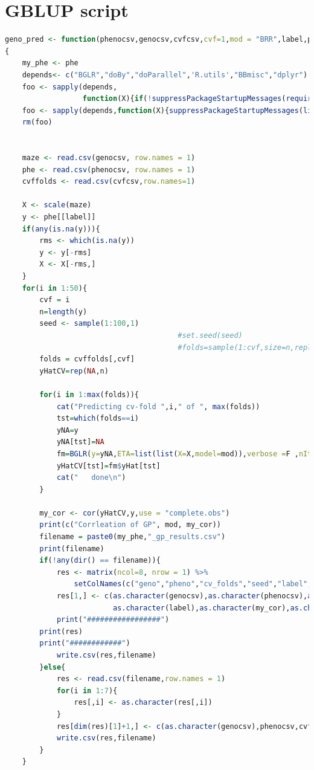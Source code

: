 \section{GBLUP script}
\begin{lstlisting}[language=R]
    geno_pred <- function(phenocsv,genocsv,cvfcsv,cvf=1,mod = "BRR",label,phe)
{
    my_phe <- phe
    depends<- c("BGLR","doBy","doParallel",'R.utils',"BBmisc","dplyr")
    foo <- sapply(depends,
                  function(X){if(!suppressPackageStartupMessages(require(X,character.only = T))){install.packages(X)}})
    foo <- sapply(depends,function(X){suppressPackageStartupMessages(library(X,character.only=TRUE))})
    rm(foo)
    
        
    maze <- read.csv(genocsv, row.names = 1)
    phe <- read.csv(phenocsv, row.names = 1)
    cvffolds <- read.csv(cvfcsv,row.names=1)
    
    X <- scale(maze)
    y <- phe[[label]]
    if(any(is.na(y))){
        rms <- which(is.na(y))
        y <- y[-rms]
        X <- X[-rms,]
    }
    for(i in 1:50){
        cvf = i
        n=length(y)
        seed <- sample(1:100,1)
                                        #set.seed(seed)
                                        #folds=sample(1:cvf,size=n,replace=T)
        folds = cvffolds[,cvf]
        yHatCV=rep(NA,n)
        
        for(i in 1:max(folds)){
            cat("Predicting cv-fold ",i," of ", max(folds))
            tst=which(folds==i)
            yNA=y
            yNA[tst]=NA
            fm=BGLR(y=yNA,ETA=list(list(X=X,model=mod)),verbose =F ,nIter=7000,burnIn=1000)
            yHatCV[tst]=fm$yHat[tst]
            cat("   done\n")
        }
        
        my_cor <- cor(yHatCV,y,use = "complete.obs")
        print(c("Corrleation of GP", mod, my_cor))
        filename = paste0(my_phe,"_gp_results.csv")
        print(filename)
        if(!any(dir() == filename)){
            res <- matrix(ncol=8, nrow = 1) %>%
                setColNames(c("geno","pheno","cv_folds","seed","label", "cor","method","nmark"))
            res[1,] <- c(as.character(genocsv),as.character(phenocsv),as.character(cvf),as.character(seed),
                         as.character(label),as.character(my_cor),as.character(mod),dim(X)[2])
            print("#################")
	    print(res)
	    print("############")
            write.csv(res,filename)
        }else{
            res <- read.csv(filename,row.names = 1)
            for(i in 1:7){
                res[,i] <- as.character(res[,i])
            }
            res[dim(res)[1]+1,] <- c(as.character(genocsv),phenocsv,cvf,seed,as.character(label),my_cor,mod,dim(X)[2])
            write.csv(res,filename)
        }
    }
    

\end{lstlisting}

